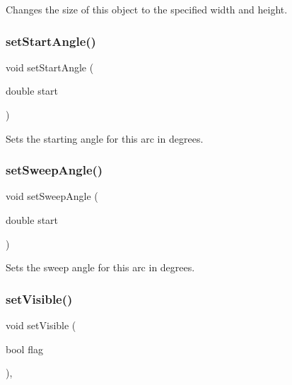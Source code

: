 Changes the size of this object to the specified width and height. 

\mbox{\label{classsgl_1_1GArc_a29b82869001d966bbfc68ad82580a35e}} 
\subsubsection{\texorpdfstring{set\+Start\+Angle()}{setStartAngle()}}
{\footnotesize\ttfamily void set\+Start\+Angle (\begin{DoxyParamCaption}\item[{double}]{start }\end{DoxyParamCaption})\hspace{0.3cm}{\ttfamily [virtual]}}



Sets the starting angle for this arc in degrees. 

\mbox{\label{classsgl_1_1GArc_a6240a9cb9e5519b2aa4fbcf81ddfc9c8}} 
\subsubsection{\texorpdfstring{set\+Sweep\+Angle()}{setSweepAngle()}}
{\footnotesize\ttfamily void set\+Sweep\+Angle (\begin{DoxyParamCaption}\item[{double}]{start }\end{DoxyParamCaption})\hspace{0.3cm}{\ttfamily [virtual]}}



Sets the sweep angle for this arc in degrees. 

\mbox{\label{classsgl_1_1GObject_a88203f28224315d9f4471212f4af8ed3}} 
\subsubsection{\texorpdfstring{set\+Visible()}{setVisible()}}
{\footnotesize\ttfamily void set\+Visible (\begin{DoxyParamCaption}\item[{bool}]{flag }\end{DoxyParamCaption})\hspace{0.3cm}{\ttfamily [virtual]}, {\ttfamily [inherited]}}



